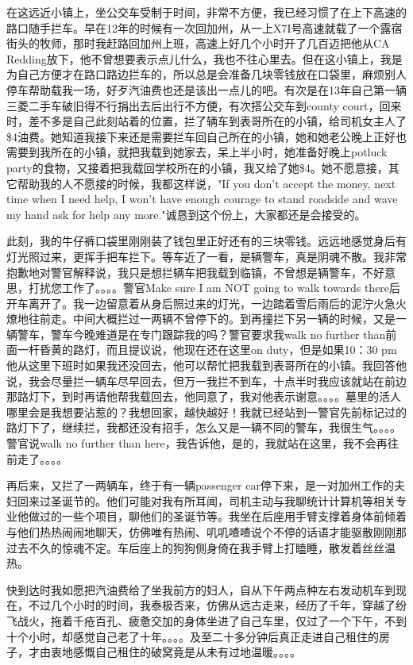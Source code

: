 \documentclass[12pt]{book}
\begin{document}
在这远近小镇上，坐公交车受制于时间，非常不方便，我已经习惯了在上下高速的路口随手拦车。早在12年的时候有一次回加州，从一上X7I号高速就载了一个露宿街头的牧师，那时我赶路回加州上班，高速上好几个小时开了几百迈把他从CA Redding放下，他不曾想要表示点儿什么，我也不往心里去。但在这小镇上，我是为自己方便才在路口路边拦车的，所以总是会准备几块零钱放在口袋里，麻烦别人停车帮助载我一场，好歹汽油费也还是该出一点儿的吧。有次是在13年自己第一辆三菱二手车破旧得不行捐出去后出行不方便，有次搭公交车到county court，回来时，差不多是自己此刻站着的位置，拦了辆车到表哥所在的小镇，给司机女主人了\$4油费。她知道我接下来还是需要拦车回自己所在的小镇，她和她老公晚上正好也需要到我所在的小镇，就把我载到她家去，呆上半小时，她准备好晚上potluck party的食物，又接着把我载回学校所在的小镇，我又给了她\$4。她不愿意接，其它帮助我的人不愿接的时候，我都这样说，"If you don't accept the money, next time when I need help, I won't have enough courage to stand roadside and wave my hand ask for help any more."诚恳到这个份上，大家都还是会接受的。

此刻，我的牛仔裤口袋里刚刚装了钱包里正好还有的三块零钱。远远地感觉身后有灯光照过来，更挥手把车拦下。等车近了一看，是辆警车，真是阴魂不散。我非常抱歉地对警官解释说，我只是想拦辆车把我载到临镇，不曾想是辆警车，不好意思，打扰您工作了。。。。警官Make sure I am NOT going to walk towards there后开车离开了。我一边留意着从身后照过来的灯光，一边踏着雪后雨后的泥泞火急火燎地往前走。中间大概拦过一两辆不曾停下的。到再撞拦下另一辆的时候，又是一辆警车，警车今晚难道是在专门跟踪我的吗？警官要求我walk no further than前面一杆昏黄的路灯，而且提议说，他现在还在这里on duty，但是如果10：30 pm他从这里下班时如果我还没回去，他可以帮忙把我载到表哥所在的小镇。我回答他说，我会尽量拦一辆车尽早回去，但万一我拦不到车，十点半时我应该就站在前边那路灯下，到时再请他帮我载回去，他同意了，我对他表示谢意。。。。墓里的活人哪里会是我想要沾惹的？我想回家，越快越好！我就已经站到一警官先前标记过的路灯下了，继续拦，我都还没有招手，怎么又是一辆不同的警车，我很生气。。。。警官说walk no further than here，我告诉他，是的，我就站在这里，我不会再往前走了。。。。

再后来，又拦了一两辆车，终于有一辆passenger car停下来，是一对加州工作的夫妇回来过圣诞节的。他们可能对我有所耳闻，司机主动与我聊统计计算机等相关专业他做过的一些个项目，聊他们的圣诞节等。我坐在后座用手臂支撑着身体前倾着与他们热热闹闹地聊天，仿佛唯有热闹、叽叽喳喳说个不停的话语才能驱散刚刚那过去不久的惊魂不定。车后座上的狗狗侧身倚在我手臂上打瞌睡，散发着丝丝温热。

快到达时我如愿把汽油费给了坐我前方的妇人，自从下午两点种左右发动机车到现在，不过几个小时的时间，我泰极否来，仿佛从远古走来，经历了千年，穿越了纷飞战火，拖着千疮百孔、疲惫交加的身体坐进了自己车里，仅过了一个下午，不到十个小时，却感觉自己老了十年。。。。及至二十多分钟后真正走进自己租住的房子，才由衷地感慨自己租住的破窝竟是从未有过地温暖。。。。
\end{document}
